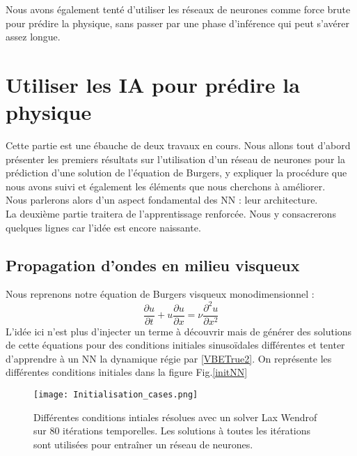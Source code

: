 \documentclass[a4paper,12pt]{article}
\newcommand\bk{\color{black}}
\newcommand\brick{\color{brick}}
\newcommand\navy{\color{navy}}
\numberwithin{equation}{section} %
\begin{document}
\noindent Nous avons également tenté d'utiliser les réseaux de neurones comme force brute pour prédire la physique, sans passer par une phase d'inférence qui peut s'avérer assez longue.
\navy \section{Utiliser les IA pour prédire la physique} \bk
\noindent Cette partie est une ébauche de deux travaux en cours. Nous allons tout d'abord présenter les premiers résultats sur l'utilisation d'un réseau de neurones pour la prédiction d'une solution de l'équation de Burgers, y expliquer la procédure que nous avons suivi et également les éléments que nous cherchons à améliorer. \\
Nous parlerons alors d'un aspect fondamental des NN : leur architecture.\\
La deuxième partie traitera de l'apprentissage renforcée. Nous y consacrerons quelques lignes car l'idée est encore naissante.
\brick \subsection{Propagation d'ondes en milieu visqueux}\bk
\noindent Nous reprenons notre équation de Burgers visqueux monodimensionnel : 
\begin{equation}
\frac{\partial u}{\partial t} + u \frac{\partial u}{\partial x} = \nu\frac{\partial^2 u}{\partial x^2}  \label{VBETrue2} \tag{VBE}
\end{equation}
L'idée ici n'est plus d'injecter un terme à découvrir mais de générer des solutions de cette équations pour des conditions initiales sinusoïdales différentes et tenter d'apprendre à un NN la dynamique régie par \eqref{VBETrue2}. On représente les différentes conditions initiales dans la figure Fig.\eqref{initNN}

\begin{figure}[!ht]
\centering
\vspace{-5mm}
\texttt{[image: Initialisation\_cases.png]}
\caption{\small{Différentes conditions intiales résolues avec un solver Lax Wendrof sur 80 itérations temporelles. Les solutions à toutes les itérations sont utilisées pour entraîner un réseau de neurones.}}
\label{initNN}
\end{figure}
\end{document}
